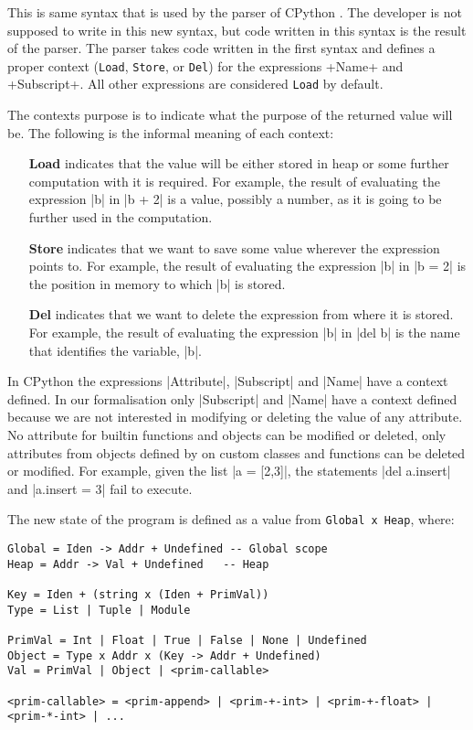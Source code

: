 This is same syntax that is used by the parser of CPython \autocite{van2007python}. The
developer is not supposed to write in this new syntax, but code written in this syntax is
the result of the parser. The parser takes code written in the first syntax and defines a
proper context (\verb|Load|, \verb|Store|, or \verb|Del|) for the expressions
\pycode+Name+ and \pycode+Subscript+. All other expressions are considered \verb|Load| by
default.

The contexts purpose is to indicate what the purpose of the returned value will be. The
following is the informal meaning of each context:

\begin{itemize}
\tightlist
\item[\textbf{Load}] indicates that the value will be either stored in heap or some further
  computation with it is required. For example, the result of evaluating the expression
  \pycode|b| in \pycode|b + 2| is a value, possibly a number, as it is going to be further
  used in the computation.
\item[\textbf{Store}] indicates that we want to save some value wherever the expression
  points to. For example, the result of evaluating the expression \pycode|b| in
  \pycode|b = 2| is the position in memory to which \pycode|b| is stored.
\item[\textbf{Del}] indicates that we want to delete the expression from where it is stored.
  For example, the result of evaluating the expression \pycode|b| in \pycode|del b| is the
  name that identifies the variable, \pycode|b|.
\end{itemize}

In CPython the expressions \pycode|Attribute|, \pycode|Subscript| and \pycode|Name| have a
context defined. In our formalisation only \pycode|Subscript| and \pycode|Name| have a
context defined because we are not interested in modifying or deleting the value of any
attribute. No attribute for builtin functions and objects can be modified or deleted, only
attributes from objects defined by on custom classes and functions can be deleted or
modified. For example, given the list \pycode|a = [2,3]|, the statements
\pycode|del a.insert| and \pycode|a.insert = 3| fail to execute.

The new state of the program is defined as a value from \verb+Global x Heap+, where:

\begin{verbatim}
Global = Iden -> Addr + Undefined -- Global scope
Heap = Addr -> Val + Undefined   -- Heap

Key = Iden + (string x (Iden + PrimVal))
Type = List | Tuple | Module

PrimVal = Int | Float | True | False | None | Undefined
Object = Type x Addr x (Key -> Addr + Undefined)
Val = PrimVal | Object | <prim-callable>

<prim-callable> = <prim-append> | <prim-+-int> | <prim-+-float> | <prim-*-int> | ...
\end{verbatim}

